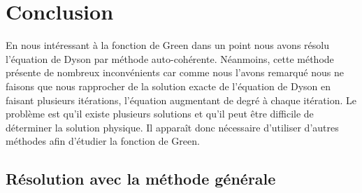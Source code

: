 \documentclass[12pt]{article}
\begin{document}
\section{Conclusion}
En nous int\'eressant \`a la fonction de Green dans un point nous avons r\'esolu l'\'equation de Dyson par m\'ethode auto-coh\'erente. 
N\'eanmoins, cette m\'ethode pr\'esente de nombreux inconv\'enients car comme nous l'avons remarqu\'e 
nous ne faisons que nous rapprocher de la solution exacte de
l'\'equation de Dyson en faisant plusieurs it\'erations, l'\'equation augmentant de degr\'e \`a chaque it\'eration. 
Le probl\`eme est qu'il existe plusieurs solutions et qu'il peut \^etre difficile de d\'eterminer la solution physique. 
Il appara\^it donc n\'ecessaire d'utiliser d'autres m\'ethodes afin d'\'etudier la fonction de Green.










\subsection{R\'esolution avec la m\'ethode g\'en\'erale}
\end{document}
